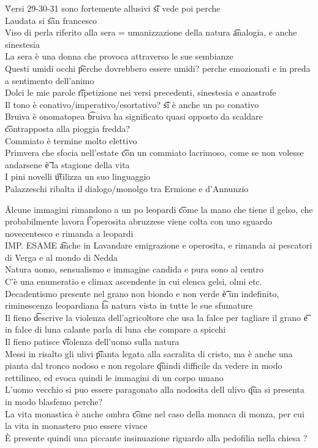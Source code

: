 \documentclass[12pt]{article}
\begin{document}
\v

Versi 29-30-31 sono fortemente allusivi \t si vede poi perche \\
Laudata si \t san francesco \\
Viso di perla riferito alla sera = umanizzazione della natura \t analogia, e anche sinestesia \\
La sera è una donna che provoca attraverso le sue sembianze \\
Questi umidi occhi \t perche dovrebbero essere umidi? perche emozionati e in preda a sentimento dell'animo \\
Dolci le mie parole \t ripetizione nei versi precedenti, sinestesia e anastrofe \\
Il tono è conativo/imperativo/esortativo? \t si è anche un po conativo \\
Bruiva è onomatopea \t bruiva ha significato quasi opposto da scaldare \t contrapposta alla pioggia fredda? \\
Commiato è termine molto elettivo \\
Primvera che sfocia nell'estate \t con un commiato lacrimoso, come se non volesse andarsene \t è la stagione della vita \\
I pini novelli \t utilizza un suo linguaggio \\
Palazzeschi ribalta il dialogo/monolgo tra Ermione e d'Annunzio

\v

Alcune immagini rimandono a un po leopardi \t come la mano che tiene il gelso, che probabilmente lavora \t l'operosita abruzzese viene colta con uno sguardo novecentesco e rimanda a leopardi \\
IMP. ESAME \t anche in Lavandare emigrazione e operosita, e rimanda ai pescatori di Verga e al mondo di Nedda \\
Natura uomo, sensualismo e immagine candida e pura sono al centro \\
C'è una enumeratio e climax ascendente in cui elenca gelsi, olmi etc. \\
Decadentismo presente nel grano non biondo e non verde \t è un indefinito, riminescenza leopardiana \t la natura vista in tutte le sue sfumature \\
Il fieno \t descrive la violenza dell'agricoltore che usa la falce per tagliare il grano \t e in falce di luna calante parla di luna che compare a spicchi \\
Il fieno patisce \t violenza dell'uomo sulla natura \\
Messi in risalto gli ulivi \t pianta legata alla sacralita di cristo, ma è anche una pianta dal tronco nodoso e non regolare \t quindi difficile da vedere in modo rettilineo, ed evoca quindi le immagini di un corpo umano \\
L'uomo vecchio si puo essere paragonato alla nodosita dell ulivo \t qua si presenta in modo blasfemo perche? \\
La vita monastica è anche ombra \t come nel caso della monaca di monza, per cui la vita in monastero puo essere vivace \\
È presente quindi una piccante insinuazione riguardo alla pedofilia nella chiesa ?
\end{document}

